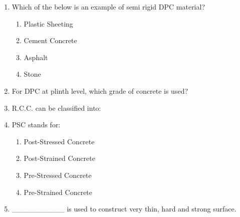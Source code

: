 \documentclass[11pt,a4paper]{article}
\begin{document}
\begin{enumerate}
\\
\item{Which of the below is an example of semi rigid DPC material?}
\begin{enumerate}[label=\Alph*.]
\item{Plastic Sheeting}
\item{Cement Concrete}
\item{Asphalt}
\item{Stone}
\end{enumerate}
\item{For DPC at plinth level, which grade of concrete is used?}
\\
\item{R.C.C. can be classified into:}
\\
\item{PSC stands for:}
\begin{enumerate}[label=\Alph*.]
\item{Post-Stressed Concrete}
\item{Post-Strained Concrete}
\item{Pre-Stressed Concrete}
\item{Pre-Strained Concrete}
\end{enumerate}
\item{\_\_\_\_\_\_\_\_\_\_ is used to construct very thin, hard and strong surface.}
\\
\end{enumerate}
\end{document}
